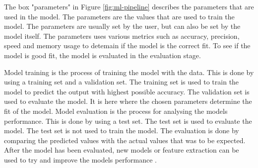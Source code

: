 The box "parameters" in Figure \ref{fig:ml-pipeline} describes the parameters that are used in the model. The parameters are the values that are used to train the model. The parameters are usually set by the user, but can also be set by the model itself. The parameters uses various metrics such as accuracy, precision, speed and memory usage to detemain if the model is the correct fit. To see if the model is good fit, the model is evaluated in the evaluation stage.

Model training is the process of training the model with the data. This is done by using a training set and a validation set. The training set is used to train the model to predict the output with highest possible accuracy. The validation set is used to evaluate the model. It is here where the chosen parameters determine the fit of the model.
Model evaluation is the process for analysing the models performance. This is done by using a test set. The test set is used to evaluate the model. The test set is not used to train the model. The evaluation is done by comparing the predicted values with the actual values that was to be expected. After the model has been evaluated, new models or feature extraction can be used to try and improve the models performance \cite{ml-pipeline-javapoint}.
